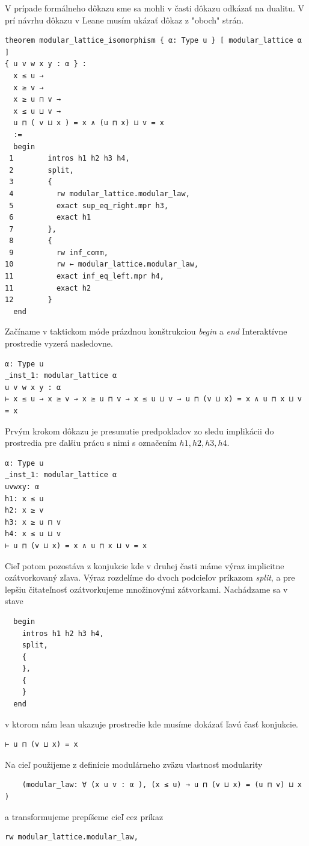 \documentclass[a4paper,10pt,oneside]{report}%
\begin{document}
    V prípade formálneho dôkazu sme sa mohli v časti dôkazu odkázať na dualitu. 
    V prí návrhu dôkazu v Leane musím ukázať dôkaz z "oboch" strán.

\begin{lstlisting}
theorem modular_lattice_isomorphism { α: Type u } [ modular_lattice α ]
{ u v w x y : α } :
  x ≤ u →
  x ≥ v →
  x ≥ u ⊓ v →
  x ≤ u ⊔ v →
  u ⊓ ( v ⊔ x ) = x ∧ (u ⊓ x) ⊔ v = x
  :=
  begin
 1        intros h1 h2 h3 h4,
 2        split,
 3        {
 4          rw modular_lattice.modular_law,
 5          exact sup_eq_right.mpr h3,
 6          exact h1
 7        },
 8        {
 9          rw inf_comm,
10          rw ← modular_lattice.modular_law,
11          exact inf_eq_left.mpr h4,
11          exact h2
12        }
  end
\end{lstlisting}
    Začíname v taktickom móde prázdnou konštrukciou \emph{begin} a \emph{end}
    Interaktívne prostredie vyzerá nasledovne.
\begin{lstlisting}
α: Type u
_inst_1: modular_lattice α
u v w x y : α
⊢ x ≤ u → x ≥ v → x ≥ u ⊓ v → x ≤ u ⊔ v → u ⊓ (v ⊔ x) = x ∧ u ⊓ x ⊔ v = x
\end{lstlisting}
    Prvým krokom dôkazu je presunutie predpokladov zo sledu implikácii do
prostredia pre ďalšiu prácu s nimi s označením $h1,h2,h3,h4$.
\begin{lstlisting}
α: Type u
_inst_1: modular_lattice α
uvwxy: α
h1: x ≤ u
h2: x ≥ v
h3: x ≥ u ⊓ v
h4: x ≤ u ⊔ v
⊢ u ⊓ (v ⊔ x) = x ∧ u ⊓ x ⊔ v = x
\end{lstlisting}
    Cieľ potom pozostáva z konjukcie kde v druhej časti máme výraz implicitne
ozátvorkovaný zľava.
    Výraz rozdelíme do dvoch podcieľov príkazom \emph{split}, a pre lepšiu
čitateľnosť ozátvorkujeme množinovými zátvorkami. Nachádzame sa v stave
\begin{lstlisting}
  begin
    intros h1 h2 h3 h4,
    split,
    {
    },
    {
    }
  end
\end{lstlisting}
v ktorom nám lean ukazuje prostredie kde musíme dokázať ľavú časť konjukcie.
\begin{lstlisting}
⊢ u ⊓ (v ⊔ x) = x
\end{lstlisting}
Na cieľ použijeme z definície modulárneho zväzu vlastnosť modularity
\begin{lstlisting}
    (modular_law: ∀ (x u v : α ), (x ≤ u) → u ⊓ (v ⊔ x) = (u ⊓ v) ⊔ x )
\end{lstlisting}
a transformujeme prepíšeme cieľ cez príkaz
\begin{lstlisting}
rw modular_lattice.modular_law,
\end{lstlisting}
\end{document}

